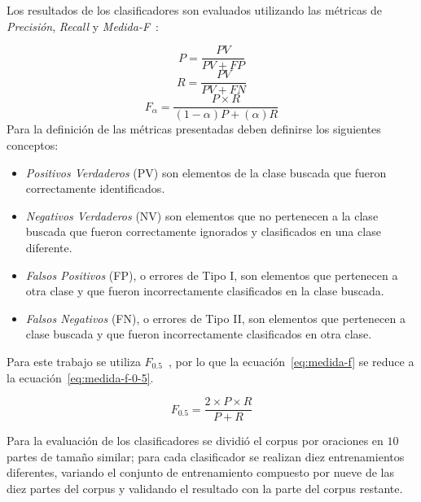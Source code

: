 \documentclass[runningheads,a4paper]{llncs}
\begin{document}
Los resultados de los clasificadores son evaluados utilizando las métricas de \emph{Precisión}, \emph{Recall} y \emph{Medida-F}~\cite{BIRD09}:

\begin{equation}
	\label{eq:precision}
	P = \frac{PV}{PV + FP}
\end{equation}
\begin{equation}
	\label{eq:recall}
	R = \frac{PV}{PV + FN}
\end{equation}
\begin{equation}
	\label{eq:medida-f}
	F_{\alpha} = \frac{P \times R}{(1 - \alpha)P + (\alpha)R}
\end{equation}
\newpage
Para la definición de las métricas presentadas deben definirse los siguientes conceptos:
\begin{itemize}
\item{\emph{Positivos Verdaderos} (PV) son elementos de la clase buscada que fueron correctamente identificados.}
\item{\emph{Negativos Verdaderos} (NV) son elementos que no pertenecen a la clase buscada que fueron correctamente ignorados y clasificados en una clase diferente.}
\item{\emph{Falsos Positivos} (FP), o errores de Tipo I, son elementos que pertenecen a otra clase y que fueron incorrectamente clasificados en la clase buscada.}
\item{\emph{Falsos Negativos} (FN), o errores de Tipo II, son elementos que pertenecen a clase buscada y que fueron incorrectamente clasificados en otra clase.}
\end{itemize}

Para este trabajo se utiliza $F_{0.5}$~\cite{MAKHOUL99}, por lo que la ecuación~\ref{eq:medida-f} se reduce a la ecuación~\ref{eq:medida-f-0-5}.

\begin{equation}
	\label{eq:medida-f-0-5}
	F_{0.5} = \frac{2 \times P \times R}{P + R}
\end{equation}

Para la evaluación de los clasificadores se dividió el corpus por oraciones en $10$ partes de tamaño similar; para cada clasificador se realizan diez entrenamientos diferentes, variando el conjunto de entrenamiento compuesto por nueve de las diez partes del corpus y validando el resultado con la parte del corpus restante. 
\end{document}
